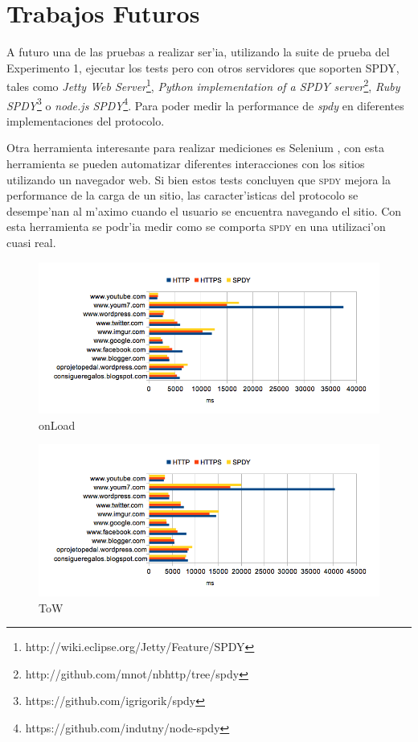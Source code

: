 \documentclass[a4paper,11pt,twocolumn]{article}
\begin{document}
\section{Trabajos Futuros}

A futuro una de las pruebas a realizar ser'ia, utilizando la suite de prueba del Experimento 1, ejecutar los tests pero con otros servidores que soporten SPDY, tales como \emph{Jetty Web Server}\footnote{http://wiki.eclipse.org/Jetty/Feature/SPDY}, \emph{Python implementation of a SPDY server}\footnote{http://github.com/mnot/nbhttp/tree/spdy}, \emph{Ruby SPDY}\footnote{https://github.com/igrigorik/spdy} o \emph{node.js SPDY}\footnote{https://github.com/indutny/node-spdy}. Para poder medir la performance de \emph{spdy} en diferentes implementaciones del protocolo.

Otra herramienta interesante para realizar mediciones es Selenium \cite{selenium}, con esta herramienta se pueden automatizar diferentes interacciones con los sitios utilizando un navegador web. Si bien estos tests concluyen que \textsc{spdy} mejora la performance de la carga de un sitio, las caracter'isticas del protocolo se desempe'nan al m'aximo cuando el usuario se encuentra navegando el sitio. Con esta herramienta se podr'ia medir como se comporta \textsc{spdy} en una utilizaci'on cuasi real.

\begin{figure}[h]
  	\centering
	\includegraphics[scale=0.93]{exp2_2}
	\caption{\small onLoad}
	\label{graf8}
\end{figure}

\begin{figure}[h]
  	\centering
	\includegraphics[scale=0.93]{exp2_3}
	\caption{\small ToW}
	\label{graf9}
\end{figure}

\onecolumn

\nocite{*}

\end{document}
